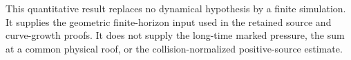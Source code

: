 This quantitative result replaces no dynamical hypothesis by a finite
simulation. It supplies the geometric finite-horizon input used in the
retained source and curve-growth proofs. It does not supply the
long-time marked pressure, the sum at a common physical roof, or the
collision-normalized positive-source estimate.
